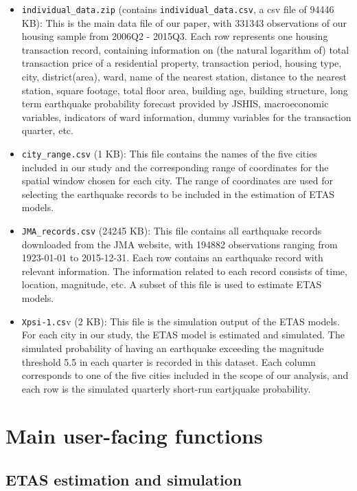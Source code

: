 \documentclass[
]{article}
\begin{document}
\begin{itemize}
\item
  \texttt{individual\_data.zip} (contains \texttt{individual\_data.csv},
  a csv file of 94446 KB): This is the main data file of our paper, with
  331343 observations of our housing sample from 2006Q2 - 2015Q3. Each
  row represents one housing transaction record, containing information
  on (the natural logarithm of) total transaction price of a residential
  property, transaction period, housing type, city, district(area),
  ward, name of the nearest station, distance to the nearest station,
  square footage, total floor area, building age, building structure,
  long term earthquake probability forecast provided by JSHIS,
  macroeconomic variables, indicators of ward information, dummy
  variables for the transaction quarter, etc.
\item
  \texttt{city\_range.csv} (1 KB): This file contains the names of the
  five cities included in our study and the corresponding range of
  coordinates for the spatial window chosen for each city. The range of
  coordinates are used for selecting the earthquake records to be
  included in the estimation of ETAS models.
\item
  \texttt{JMA\_records.csv} (24245 KB): This file contains all
  earthquake records downloaded from the JMA website, with 194882
  observations ranging from 1923-01-01 to 2015-12-31. Each row contains
  an earthquake record with relevant information. The information
  related to each record consists of time, location, magnitude, etc. A
  subset of this file is used to estimate ETAS models.
\item
  \texttt{Xpsi-1.cs}v (2 KB): This file is the simulation output of the
  ETAS models. For each city in our study, the ETAS model is estimated
  and simulated. The simulated probability of having an earthquake
  exceeding the magnitude threshold 5.5 in each quarter is recorded in
  this dataset. Each column corresponds to one of the five cities
  included in the scope of our analysis, and each row is the simulated
  quarterly short-run eartjquake probability.
\end{itemize}

\hypertarget{main-user-facing-functions}{%
\section{Main user-facing functions}\label{main-user-facing-functions}}

\hypertarget{etas-estimation-and-simulation}{%
\subsection{ETAS estimation and
simulation}\label{etas-estimation-and-simulation}}
\end{document}
